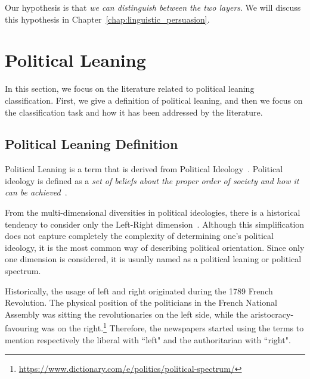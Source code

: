 

Our hypothesis is that \emph{we can distinguish between the two layers}.
We will discuss this hypothesis in Chapter~\ref{chap:linguistic_persuasion}.


\section{\statusgreen Political Leaning}
\label{sec:lit_leaning}

In this section, we focus on the literature related to political leaning classification.
First, we give a definition of political leaning, and then we focus on the classification task and how it has been addressed by the literature.

\subsection{\statusgreen Political Leaning Definition}

Political Leaning is a term that is derived from Political Ideology~\citep{jost2009political}.
Political ideology is defined as a \emph{set of beliefs about the proper order of society and how it can be achieved}~\citep[p.~64]{erikson2015american}.

From the multi-dimensional diversities in political ideologies, there is a historical tendency to consider only the Left-Right dimension~\citep{jost2009political}.
Although this simplification does not capture completely the complexity of determining one's political ideology, it is the most common way of describing political orientation.
Since only one dimension is considered, it is usually named as a political leaning or political spectrum.


Historically, the usage of left and right originated during the 1789 French Revolution. The physical position of the politicians in the French National Assembly was sitting the revolutionaries on the left side, while the aristocracy-favouring was on the right.\footnote{\url{https://www.dictionary.com/e/politics/political-spectrum/}}
Therefore, the newspapers started using the terms to mention respectively the liberal with ``left" and the authoritarian with ``right".

